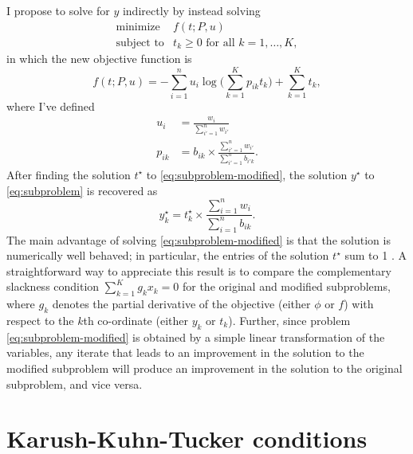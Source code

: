 \documentclass[final]{siamart171218}
\begin{document}
I propose to solve for $y$ indirectly by instead solving
\begin{equation}
\begin{array}{ll}
\mbox{minimize}   & f(t; P, u) \\
\mbox{subject to} & \mbox{$t_k \geq 0$ for all $k = 1, \ldots, K$},
\label{eq:subproblem-modified}
\end{array}
\end{equation}
in which the new objective function is
\begin{equation}
f(t; P, u) =
    - \sum_{i=1}^n u_i \log\big({\textstyle \sum_{k=1}^K p_{ik} t_k}\big)
    + \sum_{k=1}^K t_k,
\end{equation}
where I've defined
\begin{align*}
u_i    &= \frac{w_i}{\sum_{i'=1}^n w_{i'}} \\
p_{ik} &= b_{ik} \times \frac{\sum_{i'=1}^n w_{i'}}{\sum_{i'=1}^n b_{i'k}}.
\end{align*}
After finding the solution $t^{\star}$ to
\eqref{eq:subproblem-modified}, the solution $y^{\star}$ to
\eqref{eq:subproblem} is recovered as
\begin{equation}
y_k^{\star} = t_k^{\star} \times
  \frac{\sum_{i=1}^n w_i}{\sum_{i=1}^n b_{ik}}.
\end{equation}
The main advantage of solving \eqref{eq:subproblem-modified} is that
the solution is numerically well behaved; in particular, the entries
of the solution $t^{\star}$ sum to 1 \cite{kim-2019}. A
straightforward way to appreciate this result is to compare the
complementary slackness condition $\sum_{k=1}^K g_k x_k = 0$ for the
original and modified subproblems, where $g_k$ denotes the partial
derivative of the objective (either $\phi$ or $f$) with respect to the
$k$th co-ordinate (either $y_k$ or $t_k$). Further, since problem
\eqref{eq:subproblem-modified} is obtained by a simple linear
transformation of the variables, any iterate that leads to an
improvement in the solution to the modified subproblem will produce an
improvement in the solution to the original subproblem, and vice
versa.

\section{Karush-Kuhn-Tucker conditions}
\end{document}
